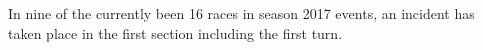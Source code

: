 In nine of the currently been 16 races in season 2017 events, an incident has taken place in the first section including the first turn.

\cite{spain}
\cite{canada}
\cite{azerbaijan}
\cite{austria}
\cite{hungary}
\cite{italy}
\cite{singapore}
\cite{malaysia}
\cite{japan}
